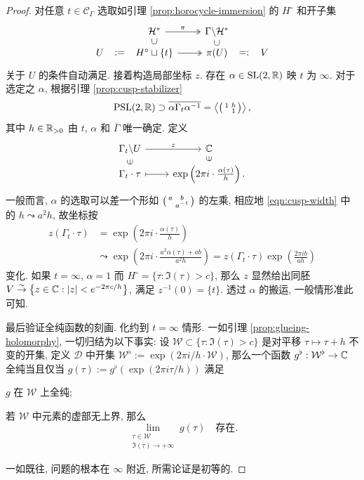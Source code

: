 \begin{proof}
	对任意 $t \in \mathcal{C}_\Gamma$ 选取如引理 \ref{prop:horocycle-immersion} 的 $H^\circ$ 和开子集
	\[\begin{tikzcd}[row sep=tiny]
		& \mathcal{H}^* \arrow[twoheadrightarrow, r, "\pi"] & \Gamma \backslash \mathcal{H}^* & \\
		U \arrow[phantom, r, ":=" description] & H^\circ \sqcup \{t\} \arrow[twoheadrightarrow, r] \arrow[phantom, u, "\subset" description, sloped] & \pi(U) \arrow[phantom, r, "=:" description] \arrow[phantom, u, "\subset" description, sloped] & V
	\end{tikzcd}\]
	关于 $U$ 的条件自动满足. 接着构造局部坐标 $z$. 存在 $\alpha \in \operatorname{SL}(2,\mathbb{R})$ 映 $t$ 为 $\infty$. 对于选定之 $\alpha$, 根据引理 \ref{prop:cusp-stabilizer}
	\begin{equation}\label{eqn:cusp-width}
		\operatorname{PSL}(2,\mathbb{R}) \supset \overline{\alpha\Gamma_t \alpha^{-1}} = \left\langle \bigl(\begin{smallmatrix} 1 & h \\  & 1 \end{smallmatrix}\bigr) \right\rangle,
	\end{equation}
	其中 $h \in \mathbb{R}_{>0}$ 由 $t$, $\alpha$ 和 $\overline{\Gamma}$ 唯一确定. 定义
	\[\begin{tikzcd}[row sep=tiny]
		\Gamma_t \backslash U \arrow[r, "z"] & \CC \\
		\Gamma_t \cdot \tau \arrow[mapsto, r] \arrow[phantom, u, "\in" description, sloped] & \exp\left(2\pi i \cdot \frac{\alpha(\tau)}{h} \right). \arrow[phantom, u, "\in" description, sloped]
	\end{tikzcd}\]
	一般而言, $\alpha$ 的选取可以差一个形如 $\bigl(\begin{smallmatrix} a & b \\  & a^{-1} \end{smallmatrix}\bigr)$ 的左乘, 相应地 \eqref{eqn:cusp-width} 中的 $h \leadsto a^2 h$, 故坐标按
	\begin{align*}
		z(\Gamma_t \cdot \tau) & = \exp\left(2\pi i \cdot \frac{\alpha(\tau)}{h} \right) \\
		& \leadsto \exp\left( 2\pi i \cdot \frac{a^2 \alpha(\tau) + ab}{a^2 h} \right) = z(\Gamma_t \cdot \tau) \exp\left( \frac{2\pi i b}{ah} \right)
	\end{align*}
	变化. 如果 $t = \infty$, $\alpha=1$ 而 $H^\circ = \{ \tau: \Im(\tau) > c\}$, 那么 $z$ 显然给出同胚 $V \stackrel{\sim}{\rightarrow} \left\{z \in \mathbb{C}: |z| < e^{-2\pi c/h} \right\}$, 满足 $z^{-1}(0) = \{t\}$. 透过 $\alpha$ 的搬运, 一般情形准此可知.
	
	最后验证全纯函数的刻画. 化约到 $t=\infty$ 情形. 一如引理 \ref{prop:glueing-holomorphy}, 一切归结为以下事实: 设 $\mathcal{W} \subset \{\tau: \Im(\tau) > c \}$ 是对平移 $\tau \mapsto \tau + h$ 不变的开集, 定义 $\mathcal{D}$ 中开集 $\mathcal{W}^\flat := \exp(2\pi i/h \cdot \mathcal{W})$, 那么一个函数 $g^\flat: \mathcal{W}^\flat \to \mathbb{C}$ 全纯当且仅当 $g(\tau) := g^\flat(\exp(2\pi i\tau /h))$ 满足
	\begin{compactitem}
		\item $g$ 在 $\mathcal{W}$ 上全纯;
		\item 若 $\mathcal{W}$ 中元素的虚部无上界, 那么 
		\[ \lim_{\substack{\tau \in \mathcal{W} \\ \Im(\tau) \to +\infty}} g(\tau) \quad \text{存在}. \]
	\end{compactitem}
	一如既往, 问题的根本在 $\infty$ 附近, 所需论证是初等的.
\end{proof}

